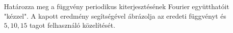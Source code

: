 Határozza meg a  
függvény periodikus kiterjesztésének Fourier együtthatóit "kézzel". A kapott 
eredmény segítségével ábrázolja az eredeti függvényt és $5,10,15$ tagot 
felhasználó közelítését.


